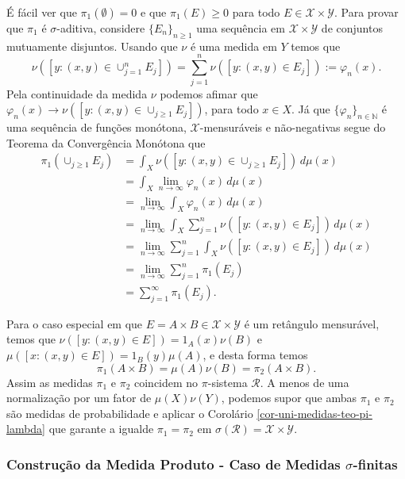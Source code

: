 É fácil ver que $\pi_1(\emptyset)=0$ e que $\pi_1(E)\geq 0$ 
para todo $E\in \mathscr{X}\times\mathscr{Y}$. Para provar
que $\pi_1$ é $\sigma$-aditiva, considere  
$\{E_n\}_{n\geq 1}$ uma sequência em $\mathscr{X}\times\mathscr{Y}$
de conjuntos mutuamente disjuntos.
Usando que $\nu$ é uma medida em $Y$ temos que 
\[
\nu([y:(x,y)\in \cup_{j=1}^n E_j ])
=
\sum_{j=1}^n \nu([y:(x,y)\in E_j ])
:=\varphi_n(x).
\]
Pela continuidade da medida $\nu$ podemos afimar que 
$\varphi_n(x) \to \nu([y:(x,y)\in \cup_{j\geq 1} E_j ])$,
para todo $x\in X$. Já que $\{\varphi_n\}_{n\in\mathbb{N}}$ é 
uma sequência de funções monótona, $\mathscr{X}$-mensuráveis 
e não-negativas segue do Teorema da Convergência
Monótona que 
\begin{align*}
\pi_1(\cup_{j\geq 1} E_j)
&=
\int_X \nu([y:(x,y)\in \cup_{j\geq 1} E_j ])\, d\mu(x)
\\
&=
\int_X \lim_{n\to\infty} \varphi_n(x)\, d\mu(x)
\\
&=
\lim_{n\to\infty}\int_X \varphi_n(x)\, d\mu(x)
\\
&=
\lim_{n\to\infty}\int_X \sum_{j=1}^n \nu([y:(x,y)\in E_j ])\, d\mu(x)
\\
&=
\lim_{n\to\infty}\sum_{j=1}^n\int_X \nu([y:(x,y)\in E_j ])\, d\mu(x)
\\
&=
\lim_{n\to\infty}\sum_{j=1}^n \pi_1(E_j)
\\
&=
\sum_{j=1}^{\infty} \pi_1(E_j).
\end{align*}



Para o caso especial em que $E=A\times B\in\mathscr{X}\times \mathscr{Y}$  
é um retângulo mensurável, 
temos que  $\nu([y:(x,y)\in E ])=1_A(x)\nu(B)$ 
e 
$\mu([x:(x,y)\in E ])=1_B(y)\mu(A)$, e desta forma temos 
\[ 
\pi_1(A\times B)=\mu(A)\nu(B)=\pi_2(A\times B).
\]
Assim as medidas $\pi_1$ e $\pi_2$ coincidem no $\pi$-sistema $\mathscr{R}$.  
A menos de uma 
normalização por um fator de $\mu(X)\nu(Y)$, podemos supor que
ambas $\pi_1$ e $\pi_2$ são medidas de probabilidade e 
aplicar o Corolário \ref{cor-uni-medidas-teo-pi-lambda} que garante
a igualde $\pi_1 = \pi_2$ em $\sigma(\mathscr{R})=\mathscr{X}\times\mathscr{Y}$. 














\subsubsection{Construção da Medida Produto - Caso de Medidas $\sigma$-finitas}



